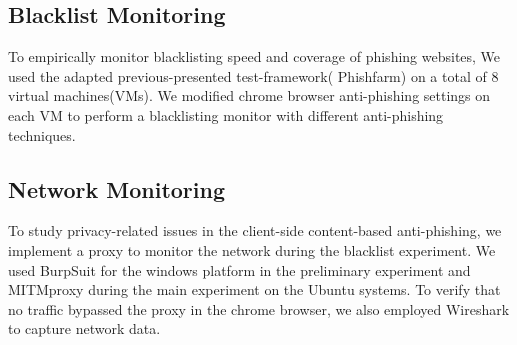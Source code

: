 \documentclass[letterpaper,twocolumn,10pt]{article}
\begin{document}
\subsection{Blacklist Monitoring}

To empirically monitor blacklisting speed and coverage
of phishing websites, We used the adapted previous-presented test-framework( Phishfarm) \cite{oest2019phishfarm} on a total of 8 virtual machines(VMs). We modified chrome browser anti-phishing settings on each VM to perform a blacklisting monitor with different anti-phishing techniques.




\subsection{Network Monitoring}

To study privacy-related issues in the client-side content-based anti-phishing, we implement a proxy to monitor the network during the blacklist experiment. We used BurpSuit for the windows platform in the preliminary experiment and MITMproxy during the main experiment on the Ubuntu systems. To verify that no traffic bypassed the proxy in the chrome browser, we also employed Wireshark to capture network data.
 
\end{document}
